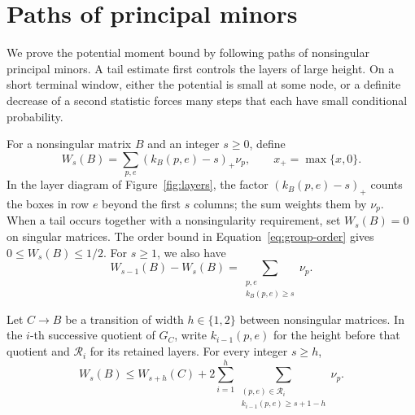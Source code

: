 \section{Paths of principal minors}\label{sec:minor-paths}

We prove the potential moment bound by following paths of nonsingular
principal minors. A tail estimate first controls the layers of large
height. On a short terminal window, either the potential is small at
some node, or a definite decrease of a second statistic forces many
steps that each have small conditional probability.

For a nonsingular matrix \(B\) and an integer \(s\ge0\), define
\[
W_s(B)=\sum_{p,e}(k_B(p,e)-s)_+\nu_p,
 \qquad x_+=\max\{x,0\}.
\]
In the layer diagram of Figure~\ref{fig:layers}, the factor
\((k_B(p,e)-s)_+\) counts the boxes in row \(e\) beyond the first
\(s\) columns; the sum weights them by \(\nu_p\).
When a tail occurs together with a nonsingularity requirement, set
\(W_s(B)=0\) on singular matrices.
The order bound in Equation~\eqref{eq:group-order} gives
\(0\le W_s(B)\le1/2\). For \(s\ge1\), we also have
\begin{equation}\label{eq:path-tail-difference}
 W_{s-1}(B)-W_s(B)=\sum_{\substack{p,e\\ k_B(p,e)\ge s}}\nu_p.
\end{equation}

\begin{lemma}\label{lem:tail-recursion}
Let \(C\to B\) be a transition of width \(h\in\{1,2\}\) between
nonsingular matrices. In the \(i\)-th successive quotient of \(G_C\),
write \(k_{i-1}(p,e)\) for the height before that quotient and
\(\mathcal R_i\) for its retained layers. For every integer \(s\ge h\),
\begin{equation}\label{eq:path-tail-recursion}
 W_s(B)\le W_{s+h}(C)
   +2\sum_{i=1}^{h}
       \sum_{\substack{(p,e)\in\mathcal R_i\\
                       k_{i-1}(p,e)\ge s+1-h}}\nu_p.
\end{equation}
\end{lemma}

